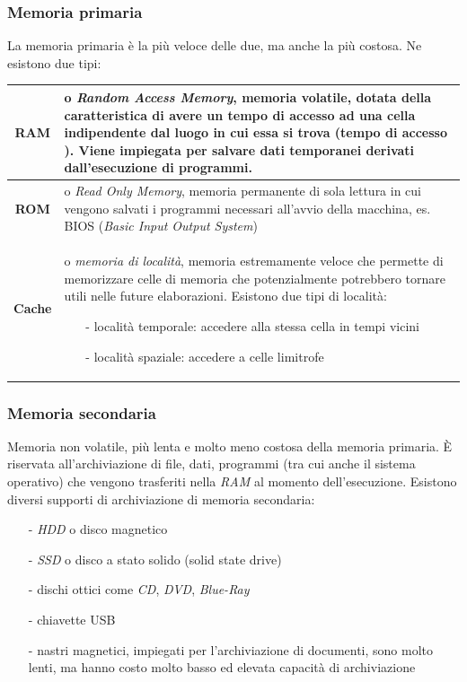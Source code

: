 \documentclass[a4paper]{article}
\begin{document}
\subsubsection*{Memoria primaria}
La memoria primaria è la più veloce delle due, ma anche la più costosa. Ne esistono due tipi:
\begin{center}
	\begin{tabularx}{\textwidth}{c X}
		\textbf{RAM} & o \textit{Random Access Memory}, memoria volatile, dotata della caratteristica di avere un tempo di accesso
		ad una cella indipendente dal luogo in cui essa si trova (tempo di accesso \say{casuale}). Viene impiegata per salvare dati 
		temporanei derivati dall'esecuzione di programmi. \\
		\midrule
		\textbf{ROM} & o \textit{Read Only Memory}, memoria permanente di sola lettura in cui vengono salvati i programmi necessari
		all'avvio della macchina, es. BIOS (\textit{Basic Input Output System}) \\
		\midrule
		\textbf{Cache} & o \textit{memoria di località}, memoria estremamente veloce che permette di memorizzare celle di memoria che
		potenzialmente potrebbero tornare utili nelle future elaborazioni. Esistono due tipi di località:
		\begin{itemize}[topsep=3pt, itemsep=0pt]
			\item[-] località temporale: accedere alla stessa cella in tempi vicini
			\item[-] località spaziale: accedere a celle limitrofe
		\end{itemize}
	\end{tabularx}
\end{center}

\subsubsection*{Memoria secondaria}
Memoria non volatile, più lenta e molto meno costosa della memoria primaria. È riservata all'archiviazione di file, dati,
programmi (tra cui anche il sistema operativo) che vengono trasferiti nella \textit{RAM} al momento dell'esecuzione.
Esistono diversi supporti di archiviazione di memoria secondaria:
\begin{itemize} [topsep=3pt, itemsep=0pt, leftmargin=5pt]
	\item[-] \textit{HDD} o disco magnetico
	\item[-] \textit{SSD} o disco a stato solido (solid state drive)
	\item[-] dischi ottici come \textit{CD}, \textit{DVD}, \textit{Blue-Ray}
	\item[-] chiavette USB
	\item[-] nastri magnetici, impiegati per l'archiviazione di documenti, sono molto lenti, ma hanno costo molto basso ed
	elevata capacità di archiviazione
\end{itemize}
\end{document}
